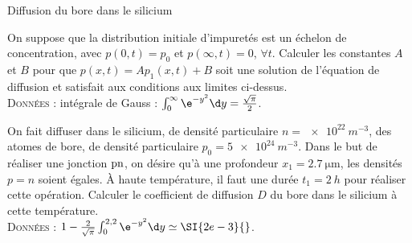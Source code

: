 \begin{exo}[PC][1][TD]{Diffusion du bore dans le silicium}
\begin{quest}
{%
}
\item On suppose que la distribution initiale d'impuretés est un échelon de concentration, avec $p(0,t)=p_0$ et $p(\infty,t)=0$, $\forall t$. Calculer les constantes $A$ et $B$ pour que $p(x,t)=A p_1(x,t) +B$ soit une solution de l'équation de diffusion et satisfait aux conditions aux limites ci-dessus. \\ 
\textsc{Données} : intégrale de Gauss : $\int_{0}^{\infty}\e^{-y^2}\d y=\frac{\sqrt{\pi}}{2}$.

\item On fait diffuser dans le silicium, de densité particulaire $n=\SI{e22}{m^{-3}}$, des atomes de bore, de densité particulaire $p_0=\SI{5e24}{m^{-3}}$. Dans le but de réaliser une jonction $\rm pn$, on désire qu'à une profondeur $x_1=\SI{2,7}{\micro\meter}$, les densités $p=n$ soient égales. À haute température, il faut une durée $t_1=\SI{2}{h}$ pour réaliser cette opération. Calculer le coefficient de diffusion $D$ du bore dans le silicium à cette température. \\

\textsc{Données} :
$1-\frac{2}{\sqrt{\pi}}\int_{0}^{2,2}\e^{-y^2}\d y\simeq \SI{2e-3}{}$.

\end{quest}
\end{exo}

